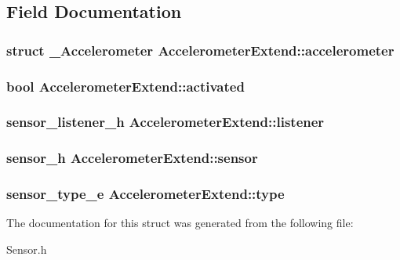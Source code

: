 \subsection{Field Documentation}
\subsubsection[{accelerometer}]{\setlength{\rightskip}{0pt plus 5cm}struct {\bf \-\_\-\-Accelerometer} Accelerometer\-Extend\-::accelerometer}\label{structAccelerometerExtend_addfd04f65f7a21730f53f90e13955920}
\subsubsection[{activated}]{\setlength{\rightskip}{0pt plus 5cm}bool Accelerometer\-Extend\-::activated}\label{structAccelerometerExtend_ab735c16bb823f44f6e6354741c16b386}
\subsubsection[{listener}]{\setlength{\rightskip}{0pt plus 5cm}sensor\-\_\-listener\-\_\-h Accelerometer\-Extend\-::listener}\label{structAccelerometerExtend_a5d89932570057de945341e8948cd0856}
\subsubsection[{sensor}]{\setlength{\rightskip}{0pt plus 5cm}sensor\-\_\-h Accelerometer\-Extend\-::sensor}\label{structAccelerometerExtend_afe886ad3297c36350ddb98f7b9260493}
\subsubsection[{type}]{\setlength{\rightskip}{0pt plus 5cm}sensor\-\_\-type\-\_\-e Accelerometer\-Extend\-::type}\label{structAccelerometerExtend_ae3f12d84515d2ef72144e3f48f52c61e}


The documentation for this struct was generated from the following file\-:\begin{DoxyCompactItemize}
\item 
Sensor.\-h\end{DoxyCompactItemize}
